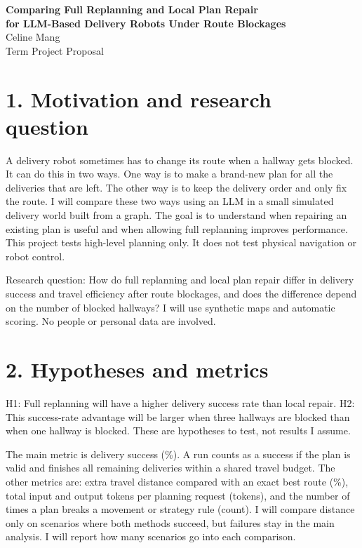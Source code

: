 \documentclass[10.5pt]{article}
\begin{document}
\begin{center}
{\Large\bfseries Comparing Full Replanning and Local Plan Repair\\ for LLM-Based Delivery Robots Under Route Blockages}\\[4pt]
Celine Mang\\
Term Project Proposal
\end{center}
\vspace{-4pt}
\section*{1. Motivation and research question}
A delivery robot sometimes has to change its route when a hallway gets blocked. It can do this in two ways. One way is to make a brand-new plan for all the deliveries that are left. The other way is to keep the delivery order and only fix the route. I will compare these two ways using an LLM in a small simulated delivery world built from a graph. The goal is to understand when repairing an existing plan is useful and when allowing full replanning improves performance. This project tests high-level planning only. It does not test physical navigation or robot control.

Research question: How do full replanning and local plan repair differ in delivery success and travel efficiency after route blockages, and does the difference depend on the number of blocked hallways? I will use synthetic maps and automatic scoring. No people or personal data are involved.

\section*{2. Hypotheses and metrics}
H1: Full replanning will have a higher delivery success rate than local repair. H2: This success-rate advantage will be larger when three hallways are blocked than when one hallway is blocked. These are hypotheses to test, not results I assume.

The main metric is delivery success (\%). A run counts as a success if the plan is valid and finishes all remaining deliveries within a shared travel budget. The other metrics are: extra travel distance compared with an exact best route (\%), total input and output tokens per planning request (tokens), and the number of times a plan breaks a movement or strategy rule (count). I will compare distance only on scenarios where both methods succeed, but failures stay in the main analysis. I will report how many scenarios go into each comparison.
\end{document}
